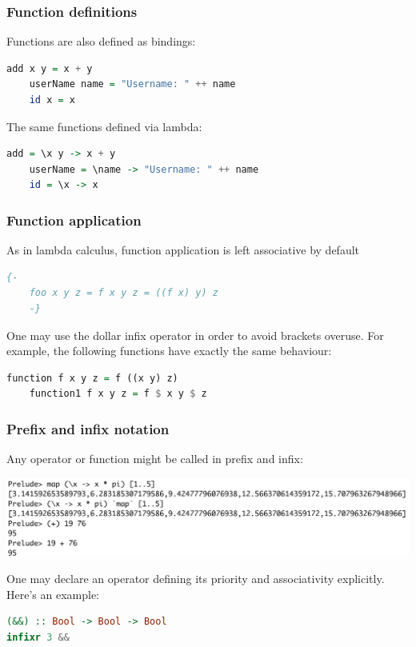 \documentclass[10pt,pdf,utf8,russian,aspectratio=169]{beamer}
\begin{document}
\begin{frame}[fragile]
  \frametitle{Function definitions}

  Functions are also defined as bindings:

  \begin{lstlisting}[language=Haskell]
    add x y = x + y
    userName name = "Username: " ++ name
    id x = x
  \end{lstlisting}

  \vspace{\baselineskip}

  The same functions defined via lambda:
  \begin{lstlisting}[language=Haskell]
    add = \x y -> x + y
    userName = \name -> "Username: " ++ name
    id = \x -> x
  \end{lstlisting}
\end{frame}

\begin{frame}[fragile]
  \frametitle{Function application}

  As in lambda calculus, function application is left associative by default

  \begin{lstlisting}[language=Haskell]
    {-
    foo x y z = f x y z = ((f x) y) z
    -}
  \end{lstlisting}

\vspace{\baselineskip}

  One may use the dollar infix operator in order to avoid brackets overuse. For example, the following functions have exactly the same behaviour:

  \begin{lstlisting}[language=Haskell]
    function f x y z = f ((x y) z)
    function1 f x y z = f $ x y $ z
  \end{lstlisting}
\end{frame}

\begin{frame}[fragile]
  \frametitle{Prefix and infix notation}
  Any operator or function might be called in prefix and infix:

  \begin{center}
  \includegraphics[scale=0.41]{Pics/InfixPrefix.png}
  \end{center}

  \vspace{\baselineskip}

  One may declare an operator defining its priority and associativity explicitly. Here's an example:

\begin{lstlisting}[language=Haskell]
(&&) :: Bool -> Bool -> Bool
infixr 3 &&
\end{lstlisting}
\end{frame}
\end{document}
